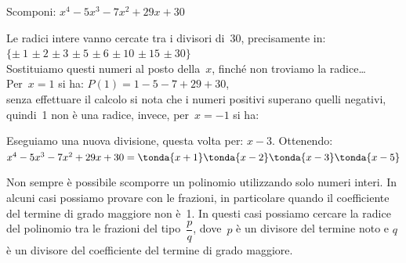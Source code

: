 \begin{esempio}{}{}
Scomponi: \(x^4-5x^3-7x^2+29x+30\)

Le radici intere vanno cercate tra i divisori di~30, precisamente in:\\
\phantom{.}\hfill
\(\{\pm~1\) \(\pm~2\) \(\pm~3\) \(\pm~5\) \(\pm~6\) \(\pm~10\)
\(\pm~15\) \(\pm~30\}\)
\hfill ~\\
Sostituiamo questi numeri al posto della~\(x\), finché non troviamo la 
radice\dots\\
Per~\(x=1\) si ha: \quad \(P(1)=1-5-7+29+30\), \\
senza effettuare il calcolo si nota 
che i numeri positivi superano quelli negativi, quindi~1 non è una 
radice, invece, per~\(x=-1\) si ha:


\vspace{.5em}
Eseguiamo una nuova divisione, questa volta per: \(x-3\).
Ottenendo: \\
\(x^4-5x^3-7x^2+29x+30 = \tonda{x+1}\tonda{x-2}\tonda{x-3}\tonda{x-5}\)
\end{esempio}

Non sempre è possibile scomporre un polinomio utilizzando solo numeri
interi. In alcuni casi possiamo provare con le frazioni, in particolare
quando il coefficiente del termine di grado maggiore non è~1. In
questi casi possiamo cercare la radice del polinomio tra le frazioni
del tipo~\(\dfrac{p}{q}\), dove~\(p\) è un divisore del termine noto e 
\(q\) è un divisore del coefficiente del termine di grado maggiore.

